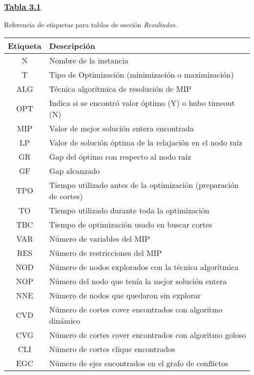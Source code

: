 \subsubsection*{\underline{Tabla 3.1}}

\noindent Referencia de etiquetas para tablas de sección \emph{Resultados}.\\

{
\centering
\begin{tabular}{c p{10cm}}
\\
\hline
\textbf{Etiqueta} & \textbf{Descripción}\\
\hline
N & Nombre de la instancia\\
\hline
T & Tipo de Optimización (minimización o maximización)\\
\hline
ALG & Técnica algorítmica de resolución de MIP\\
\hline
OPT & Indica si se encontró valor óptimo (Y) o hubo timeout (N)\\
\hline
MIP & Valor de mejor solución entera encontrada\\
\hline
LP & Valor de solución óptima de la relajación en el nodo raíz\\
\hline
GR & Gap del óptimo con respecto al nodo raíz\\
\hline
GF & Gap alcanzado\\
\hline
TPO & Tiempo utilizado antes de la optimización (preparación de cortes)\\
\hline
TO & Tiempo utilizado durante toda la optimización\\
\hline
TBC & Tiempo de optimización usado en buscar cortes\\
\hline
VAR & Número de variables del MIP\\
\hline
RES & Número de restricciones del MIP\\
\hline
NOD & Número de nodos explorados con la técnica algorítmica\\
\hline
NOP & Número del nodo que tenía la mejor solución entera\\
\hline
NNE & Número de nodos que quedaron sin explorar\\
\hline
CVD & Número de cortes cover encontrados con algoritmo dinámico\\
\hline
CVG & Número de cortes cover encontrados con algoritmo goloso\\
\hline
CLI & Número de cortes clique encontrados\\
\hline
EGC & Número de ejes encontrados en el grafo de conflictos\\
\hline
\end{tabular}\\}
\vspace{4mm}
